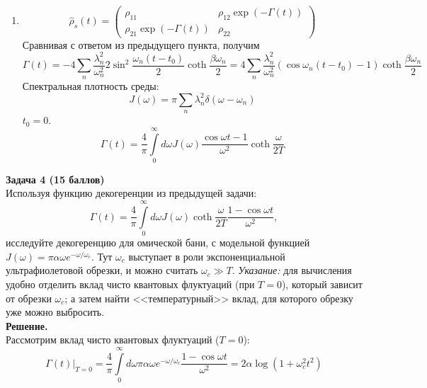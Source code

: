 \documentclass[12pt]{article}
\theoremstyle{definition}
\begin{document}
\begin{enumerate}
    \item
    \begin{equation}
        \hat{\rho}_s(t)=\begin{pmatrix}
        \rho_{11} & \rho_{12}\exp(-\Gamma(t))\\
        \rho_{21}\exp(-\Gamma(t)) & \rho_{22}
        \end{pmatrix}
    \end{equation}
    Сравнивая с ответом из предыдущего пункта, получим
    \begin{equation}
        \Gamma(t)=-4\sum\limits_n\frac{\lambda^2_n}{\omega^2_n}2\sin^2\frac{\omega_n(t-t_0)}{2}\coth\frac{\beta\omega_n}{2}=4\sum\limits_n\frac{\lambda^2_n}{\omega^2_n}(\cos\omega_n(t-t_0)-1)\coth\frac{\beta\omega_n}{2}
    \end{equation}
    Спектральная плотность среды:
    \begin{equation}
        J(\omega)=\pi\sum\limits_n\lambda^2_n\delta(\omega-\omega_n)
    \end{equation}
    $t_0=0$.
    \begin{equation}
        \boxed{\Gamma(t)=\frac{4}{\pi}\int\limits_0^\infty d\omega J(\omega)\frac{\cos\omega t-1}{\omega^2}\coth\frac{\omega}{2T}}
    \end{equation}
\end{enumerate}
\textbf{Задача 4 (15 баллов)}\\
Используя функцию декогеренции из предыдущей задачи:
\begin{equation}
    \Gamma(t) = \frac{4}{\pi}\int\limits_0^\infty d\omega J(\omega)\coth\frac{\omega}{2T}\frac{1-\cos\omega t}{\omega^2},
\end{equation}
исследуйте декогеренцию для омической бани, с модельной функцией $J(\omega) = \pi\alpha\omega e^{-\omega/\omega_c}$. Тут $\omega_c$ выступает в роли экспоненциальной ультрафиолетовой обрезки, и можно считать $\omega_c\gg T$.
\textit{Указание:} для вычисления удобно отделить вклад чисто квантовых флуктуаций (при $T = 0$), который зависит от обрезки $\omega_c$; а затем найти <<температурный>> вклад, для которого обрезку уже можно выбросить.\\
\textbf{Решение.}\\
Рассмотрим вклад чисто квантовых флуктуаций ($T=0$):
\begin{equation}
    \Gamma(t)\bigg|_{T=0} = \frac{4}{\pi}\int\limits_0^\infty d\omega \pi\alpha\omega e^{-\omega/\omega_c}\frac{1-\cos\omega t}{\omega^2}=2\alpha\log(1+\omega^2_ct^2)
\end{equation}
\end{document}
